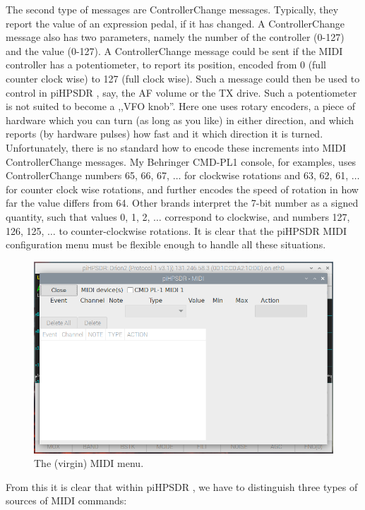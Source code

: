 \documentclass[12pt]{book}
\def\pH{pi\-HPSDR }
\begin{document}
The second type of messages are ControllerChange messages. Typically, they report the value of
an expression pedal, if it has changed. A ControllerChange message also has two parameters,
namely the number of the controller (0-127) and the value (0-127). A ControllerChange
message could be sent if the MIDI controller has a potentiometer, to report its position,
encoded from 0 (full counter clock wise) to 127 (full clock wise). Such a message could then be
used to control in \pH, say, the AF volume or the TX drive. Such a potentiometer is
not suited to become a ,,VFO knob''. Here one uses rotary encoders, a piece of hardware which
you can turn (as long as you like) in either direction, and which reports (by hardware pulses)
how fast and it which direction it is turned. Unfortunately, there is no standard how to
encode these increments into MIDI ControllerChange messages. My Behringer CMD-PL1 console,
for examples, uses ControllerChange numbers 65, 66, 67, $\ldots$ for clockwise rotations
and 63, 62, 61, $\ldots$ for counter clock wise rotations, and further encodes the speed of
rotation in how far the value differs from 64. Other brands interpret the 7-bit number
as a signed quantity, such that values 0, 1, 2, $\ldots$ correspond to clockwise,
and numbers 127, 126, 125, $\ldots$ to counter-clockwise rotations. It is clear that
the \pH MIDI configuration menu must be flexible enough to handle all these situations.

\begin{figure}[ht]
\center
\includegraphics[width=12cm]{MIDImenu1.png}
\caption{The (virgin) MIDI menu.}
\label{fig:MIDImenu1}
\end{figure}

From this it is clear that within \pH, we have to distinguish three types of sources
of MIDI commands:
\end{document}
